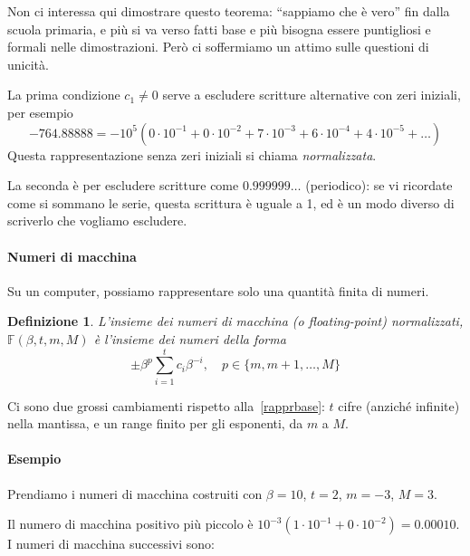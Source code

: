 \documentclass[a4paper]{report}
\theoremstyle{definiton}
\newtheorem{definition}[theorem]{Definizione}
\theoremstyle{remark}
\begin{document}
Non ci interessa qui dimostrare questo teorema: ``sappiamo che è vero'' fin dalla scuola primaria, e più si va verso fatti base e più bisogna essere puntigliosi e formali nelle dimostrazioni. Però ci soffermiamo un attimo sulle questioni di unicità.

La prima condizione $c_1 \neq 0$ serve a escludere scritture alternative con zeri iniziali, per esempio
\[
-764.88888 = - 10^5 (0 \cdot 10^{-1} + 0 \cdot 10^{-2} + 7\cdot 10^{-3} + 6\cdot 10^{-4} + 4\cdot 10^{-5} + \dots)
\]
Questa rappresentazione senza zeri iniziali si chiama \emph{normalizzata}.

La seconda è per escludere scritture come $0.999999\dots$ (periodico): se vi ricordate come si sommano le serie, questa scrittura è uguale a 1, ed è un modo diverso di scriverlo che vogliamo escludere.

\paragraph{Numeri di macchina}
Su un computer, possiamo rappresentare solo una quantità finita di numeri.
\begin{definition}
    L'insieme dei \emph{numeri di macchina (o floating-point) normalizzati}, $\mathbb{F}(\beta, t, m, M)$ è l'insieme dei numeri della forma
    \[
        \pm \beta^p \sum_{i=1}^t c_i \beta^{-i}, \quad p \in \{m, m+1, \dots, M\}  
    \]
\end{definition}
Ci sono due grossi cambiamenti rispetto alla~\eqref{rapprbase}: $t$ cifre (anziché infinite) nella mantissa, e un range finito per gli esponenti, da $m$ a $M$.

\paragraph{Esempio} Prendiamo i numeri di macchina costruiti con $\beta=10$, $t=2$, $m=-3$, $M=3$.

Il numero di macchina positivo più piccolo è $10^{-3}(1 \cdot 10^{-1} + 0 \cdot 10^{-2}) = 0.00010$. I numeri di macchina successivi sono:
\end{document}
